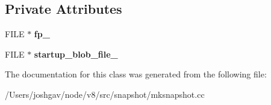 \subsection*{Private Attributes}
\begin{DoxyCompactItemize}
\item 
F\+I\+LE $\ast$ {\bfseries fp\+\_\+}\hypertarget{class_snapshot_writer_a559c6e075db37b5a61720cd77c84c03c}{}\label{class_snapshot_writer_a559c6e075db37b5a61720cd77c84c03c}

\item 
F\+I\+LE $\ast$ {\bfseries startup\+\_\+blob\+\_\+file\+\_\+}\hypertarget{class_snapshot_writer_a54441b189bbc835d5adfb170b2b8f212}{}\label{class_snapshot_writer_a54441b189bbc835d5adfb170b2b8f212}

\end{DoxyCompactItemize}


The documentation for this class was generated from the following file\+:\begin{DoxyCompactItemize}
\item 
/\+Users/joshgav/node/v8/src/snapshot/mksnapshot.\+cc\end{DoxyCompactItemize}
